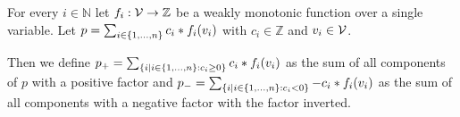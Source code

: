 \begin{definition}
  For every $i \in \mathbb{N}$ let $f_i: \mathcal{V} \rightarrow \mathbb{Z}$ be a weakly monotonic function over a single variable.
  Let $p = \sum_{i \in \lbrace 1, \dots, n \rbrace} c_i * f_i(v_i)$ with $c_i \in \mathbb{Z}$ and $v_i \in \mathcal{V}$.

  Then we define $p_+ = \sum_{\lbrace i \mid i \in \lbrace 1, \dots, n \rbrace: c_i \geq 0 \rbrace} c_i * f_i(v_i)$ as the sum of all components of $p$ with a positive factor and $p_- = \sum_{\lbrace i \mid i \in \lbrace 1, \dots, n \rbrace: c_i < 0 \rbrace} -c_i * f_i(v_i)$ as the sum of all components with a negative factor with the factor inverted.
\end{definition}
